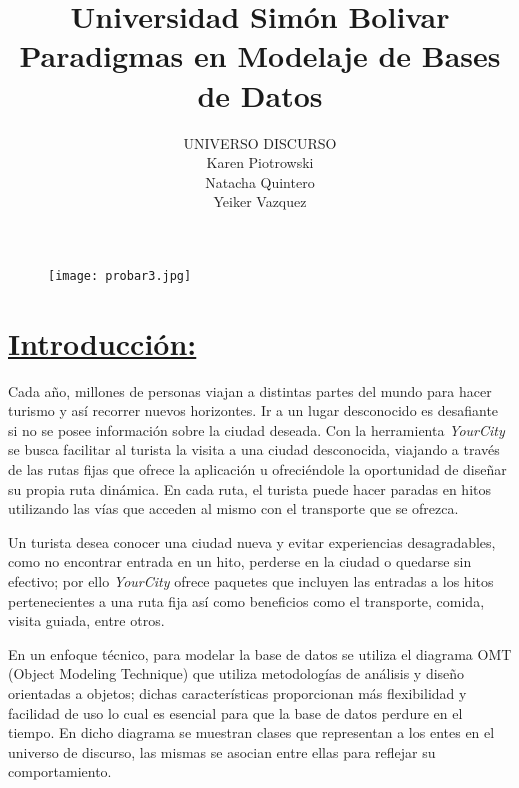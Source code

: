 \documentclass[a4paper]{article}
\begin{document}
\title{\LARGE{Universidad Simón Bolivar} \hspace{5 cm}
\LARGE{Paradigmas en Modelaje de Bases de Datos}}

\begin{figure}
\centering
\texttt{[image: probar3.jpg]}
\end{figure}

  \vspace{3 cm}
\author{ \Huge{UNIVERSO DISCURSO}\vspace{1 cm} \\ Karen Piotrowski \\ Natacha Quintero \\ Yeiker Vazquez}


\maketitle {}


\vspace{15 cm}



\section{ \underline{Introducción:} }

   \setlength{\parindent}{0,5cm}
\setlength{\parskip}{\baselineskip} 

    \hspace{0,4 cm} Cada año, millones de personas viajan a distintas partes del mundo para hacer turismo y así recorrer nuevos horizontes. Ir a un lugar desconocido es desafiante si no se posee información sobre la ciudad deseada. Con la herramienta  \textit{YourCity} se busca facilitar al turista la visita a una ciudad desconocida, viajando a través de las rutas fijas que ofrece la aplicación u ofreciéndole la oportunidad de diseñar su propia ruta dinámica. En cada ruta, el turista puede hacer paradas en hitos utilizando las vías que acceden al mismo con el transporte que se ofrezca.

	Un turista desea conocer una ciudad nueva y evitar experiencias desagradables, como no encontrar entrada en un hito, perderse en la ciudad o quedarse sin efectivo; por ello \textit{YourCity} ofrece paquetes que incluyen las entradas a los hitos pertenecientes a una ruta fija así como beneficios como el transporte, comida, visita guiada, entre otros.

En un enfoque técnico, para modelar la base de datos se utiliza el diagrama OMT (Object Modeling Technique) que utiliza metodologías de análisis y diseño orientadas a objetos; dichas características proporcionan más flexibilidad y facilidad de uso lo cual es esencial para que la base de datos perdure en el tiempo. En dicho diagrama se muestran clases que representan a los entes en el universo de discurso, las mismas se asocian entre ellas para reflejar su comportamiento.
\end{document}
